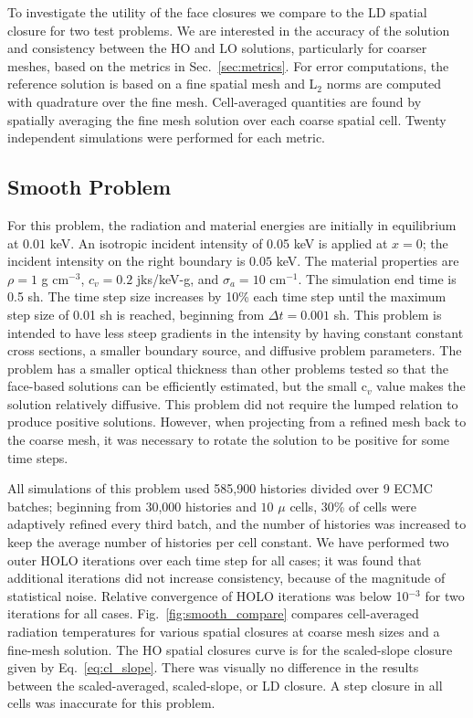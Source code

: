 To investigate the utility of the face closures we compare to the LD spatial
closure for two test problems.  We are interested in the accuracy of the solution and
consistency between the HO and LO solutions, particularly for coarser meshes,
based on the metrics in Sec.~\ref{sec:metrics}. For error computations, the reference
solution is based on a fine spatial mesh and L$_2$ norms are computed with quadrature over
the fine mesh.  Cell-averaged quantities are found by spatially averaging the fine mesh solution over
each coarse spatial cell. Twenty independent simulations were performed for each metric.

\subsection{Smooth Problem}

For this problem, the radiation and material energies are initially in
equilibrium at $0.01$ keV.   An isotropic incident intensity of 0.05 keV is applied
at $x=0$; the incident intensity on the right boundary is $0.05$ keV.
The material properties are $\rho = 1$ g cm$^{-3}$, $c_v = 0.2$ jks/keV-g, and
$\sigma_a=10$ cm$^{-1}$.
The simulation end time is 0.5 sh.  The time step size increases by 10\% each time step
until the maximum step size of 0.01 sh is reached, beginning from $\Delta t = 0.001$ sh.
This problem is intended to have less steep gradients in the intensity by having constant constant cross
sections, a smaller boundary source, and diffusive problem parameters.
The problem has a smaller optical thickness than other problems tested so that the face-based solutions can be efficiently
estimated, but the small c$_v$ value makes the solution relatively diffusive.  This
problem did not require the lumped relation to produce positive solutions.
However, when projecting from a refined mesh back to the coarse mesh, it was
necessary to rotate the solution to be positive for some time steps.

All simulations of this problem used 585,900 histories divided over 9 ECMC
batches;  beginning from 30,000 histories and $10$ $\mu$ cells, 30\% of cells were
adaptively refined every third batch, and the number of histories was increased to
keep the average number of histories per cell constant. 
We have performed two outer HOLO iterations over each time step for all cases; it was
found that additional iterations did not increase consistency, because of the  magnitude
of statistical noise.  Relative convergence of HOLO iterations was below 10$^{-3}$
for two iterations for all cases.  
Fig.~\ref{fig:smooth_compare} compares cell-averaged radiation temperatures for various spatial closures at
coarse mesh sizes and a fine-mesh solution.  The HO spatial closures curve is for the
scaled-slope closure given by Eq.~\eqref{eq:cl_slope}.  There was visually
no difference in the results between the scaled-averaged, scaled-slope, or LD closure. A step closure in all cells
was inaccurate for this problem.

